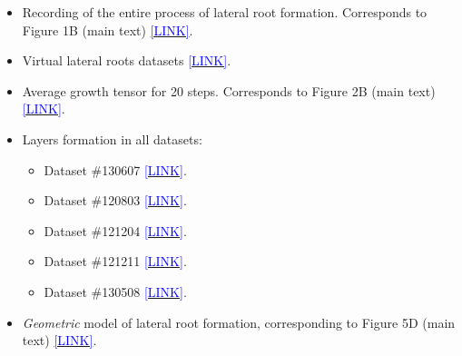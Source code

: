 \documentclass[11pt,a4paper, final]{article}
\newenvironment{Itemize}{
 \begin{itemize}[leftmargin=0.5cm]{
}}{\end{itemize}}
\begin{document}
\begin{Itemize}
  \item Recording of the entire process of lateral root formation. Corresponds to Figure 1B (main text) \href{http://youtu.be/navcxqh7KCo}{\textcolor{blue}{[LINK]}}.
  \item Virtual lateral roots datasets \href{https://youtu.be/JbXwgQ3P6h4}{\textcolor{blue}{[LINK]}}.
  \item Average growth tensor for 20 steps. Corresponds to Figure 2B (main text) \href{https://youtu.be/t2hpMR6VFIg}{\textcolor{blue}{[LINK]}}.
  \item Layers formation in all datasets:
  \begin{Itemize}
    \item Dataset \#130607 \href{http://youtu.be/cdY3t1iVRF8}{\textcolor{blue}{[LINK]}}.
    \item Dataset \#120803 \href{http://youtu.be/yXki6QpltZo}{\textcolor{blue}{[LINK]}}.
    \item Dataset \#121204 \href{http://youtu.be/Bd_UgUVyzrM}{\textcolor{blue}{[LINK]}}.
    \item Dataset \#121211 \href{http://youtu.be/NOouEVqpGj8}{\textcolor{blue}{[LINK]}}.
    \item Dataset \#130508 \href{http://youtu.be/EajarNlRvtA}{\textcolor{blue}{[LINK]}}.
  \end{Itemize}
  \item \emph{Geometric} model of lateral root formation, corresponding to Figure 5D (main text) \href{https://youtu.be/1bVEY_ORSfI}{\textcolor{blue}{[LINK]}}.

\end{Itemize}
\end{document}
